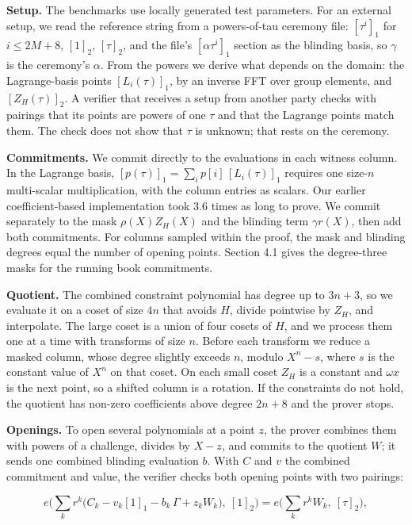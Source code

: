 \textbf{Setup.} The benchmarks use locally generated test parameters. For an external setup, we read the reference string from a powers-of-tau ceremony file: \([\tau^i]_1\) for \(i \le 2M + 8\), \([1]_2\), \([\tau]_2\), and the file's \([\alpha\tau^i]_1\) section as the blinding basis, so \(\gamma\) is the ceremony's \(\alpha\). From the powers we derive what depends on the domain: the Lagrange-basis points \([L_i(\tau)]_1\), by an inverse FFT over group elements, and \([Z_H(\tau)]_2\). A verifier that receives a setup from another party checks with pairings that its points are powers of one \(\tau\) and that the Lagrange points match them. The check does not show that \(\tau\) is unknown; that rests on the ceremony.

\textbf{Commitments.} We commit directly to the evaluations in each witness column. In the Lagrange basis, \([p(\tau)]_1=\sum_i p[i]\,[L_i(\tau)]_1\) requires one size-\(n\) multi-scalar multiplication, with the column entries as scalars. Our earlier coefficient-based implementation took 3.6 times as long to prove. We commit separately to the mask \(\rho(X)Z_H(X)\) and the blinding term \(\gamma r(X)\), then add both commitments. For columns sampled within the proof, the mask and blinding degrees equal the number of opening points. Section 4.1 gives the degree-three masks for the running book commitments.

\textbf{Quotient.} The combined constraint polynomial has degree up to \(3n + 3\), so we evaluate it on a coset of size \(4n\) that avoids \(H\), divide pointwise by \(Z_H\), and interpolate. The large coset is a union of four cosets of \(H\), and we process them one at a time with transforms of size \(n\). Before each transform we reduce a masked column, whose degree slightly exceeds \(n\), modulo \(X^n - s\), where \(s\) is the constant value of \(X^n\) on that coset. On each small coset \(Z_H\) is a constant and \(\omega x\) is the next point, so a shifted column is a rotation. If the constraints do not hold, the quotient has non-zero coefficients above degree \(2n + 8\) and the prover stops.

\textbf{Openings.} To open several polynomials at a point \(z\), the prover combines them with powers of a challenge, divides by \(X - z\), and commits to the quotient \(W\); it sends one combined blinding evaluation \(b\). With \(C\) and \(v\) the combined commitment and value, the verifier checks both opening points with two pairings:

\[
e\Big(\sum_{k} r^k \big(C_k - v_k [1]_1 - b_k\, \Gamma + z_k W_k\big),\ [1]_2\Big) = e\Big(\sum_{k} r^k W_k,\ [\tau]_2\Big),
\]

